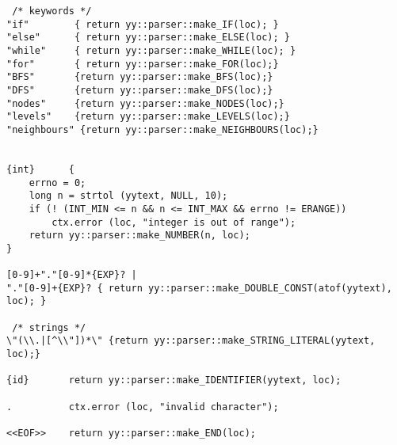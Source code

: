 \documentclass[english,a4paper,12pt]{report}
\begin{document}
\begin{lstlisting}
 /* keywords */
"if"        { return yy::parser::make_IF(loc); }
"else"      { return yy::parser::make_ELSE(loc); }
"while"     { return yy::parser::make_WHILE(loc); }
"for"       { return yy::parser::make_FOR(loc);}
"BFS"       {return yy::parser::make_BFS(loc);}
"DFS"       {return yy::parser::make_DFS(loc);}
"nodes"     {return yy::parser::make_NODES(loc);}
"levels"    {return yy::parser::make_LEVELS(loc);}
"neighbours" {return yy::parser::make_NEIGHBOURS(loc);}


{int}      {
    errno = 0;
    long n = strtol (yytext, NULL, 10);
    if (! (INT_MIN <= n && n <= INT_MAX && errno != ERANGE))
        ctx.error (loc, "integer is out of range");
    return yy::parser::make_NUMBER(n, loc);
}

[0-9]+"."[0-9]*{EXP}? |
"."[0-9]+{EXP}? { return yy::parser::make_DOUBLE_CONST(atof(yytext), loc); }

 /* strings */
\"(\\.|[^\\"])*\" {return yy::parser::make_STRING_LITERAL(yytext, loc);}

{id}       return yy::parser::make_IDENTIFIER(yytext, loc);

.          ctx.error (loc, "invalid character");

<<EOF>>    return yy::parser::make_END(loc);
\end{lstlisting}
\end{document}
